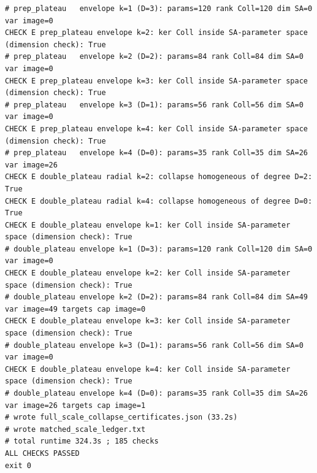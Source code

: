 \documentclass{article}
\theoremstyle{remark}
\begin{document}
\begin{lstlisting}
# prep_plateau   envelope k=1 (D=3): params=120 rank Coll=120 dim SA=0 var image=0 
CHECK E prep_plateau envelope k=2: ker Coll inside SA-parameter space (dimension check): True
# prep_plateau   envelope k=2 (D=2): params=84 rank Coll=84 dim SA=0 var image=0 
CHECK E prep_plateau envelope k=3: ker Coll inside SA-parameter space (dimension check): True
# prep_plateau   envelope k=3 (D=1): params=56 rank Coll=56 dim SA=0 var image=0 
CHECK E prep_plateau envelope k=4: ker Coll inside SA-parameter space (dimension check): True
# prep_plateau   envelope k=4 (D=0): params=35 rank Coll=35 dim SA=26 var image=26 
CHECK E double_plateau radial k=2: collapse homogeneous of degree D=2: True
CHECK E double_plateau radial k=4: collapse homogeneous of degree D=0: True
CHECK E double_plateau envelope k=1: ker Coll inside SA-parameter space (dimension check): True
# double_plateau envelope k=1 (D=3): params=120 rank Coll=120 dim SA=0 var image=0 
CHECK E double_plateau envelope k=2: ker Coll inside SA-parameter space (dimension check): True
# double_plateau envelope k=2 (D=2): params=84 rank Coll=84 dim SA=49 var image=49 targets cap image=0
CHECK E double_plateau envelope k=3: ker Coll inside SA-parameter space (dimension check): True
# double_plateau envelope k=3 (D=1): params=56 rank Coll=56 dim SA=0 var image=0 
CHECK E double_plateau envelope k=4: ker Coll inside SA-parameter space (dimension check): True
# double_plateau envelope k=4 (D=0): params=35 rank Coll=35 dim SA=26 var image=26 targets cap image=1
# wrote full_scale_collapse_certificates.json (33.2s)
# wrote matched_scale_ledger.txt
# total runtime 324.3s ; 185 checks
ALL CHECKS PASSED
exit 0
\end{lstlisting}
\end{document}
